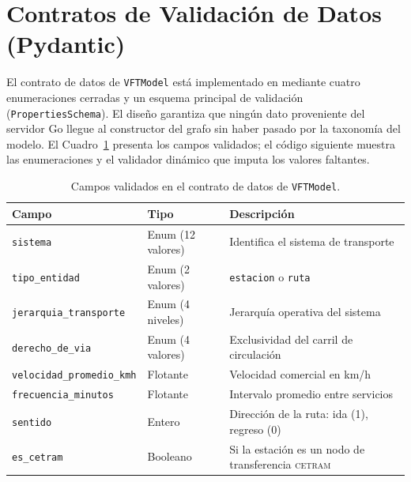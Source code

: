 
\section{Contratos de Validación de Datos (Pydantic)}
\label{anx:vft-validacion}

El contrato de datos de \texttt{VFTModel} está implementado en
 mediante cuatro enumeraciones cerradas y un
esquema principal de validación (\texttt{PropertiesSchema}). El diseño garantiza
que ningún dato proveniente del servidor Go llegue al constructor del grafo sin
haber pasado por la taxonomía del modelo. El
Cuadro~\ref{tab:vft-campos-validados} presenta los campos validados; el código
siguiente muestra las enumeraciones y el validador dinámico que imputa los
valores faltantes.

\begin{table}[H]
    \centering
    \caption[Campos validados en el contrato de datos de \texttt{VFTModel}]{Campos
    validados en el contrato de datos de \texttt{VFTModel}.
    }
    \label{tab:vft-campos-validados}
    \begin{tabularx}{\textwidth}{|l|l|X|}
        \hline
        \textbf{Campo} & \textbf{Tipo} & \textbf{Descripción} \\
        \hline
        \texttt{sistema}                  & Enum (12 valores) &
            Identifica el sistema de transporte \\
        \texttt{tipo\_entidad}            & Enum (2 valores) &
            \texttt{estacion} o \texttt{ruta} \\
        \texttt{jerarquia\_transporte}    & Enum (4 niveles) &
            Jerarquía operativa del sistema \\
        \texttt{derecho\_de\_via}         & Enum (4 valores) &
            Exclusividad del carril de circulación \\
        \texttt{velocidad\_promedio\_kmh} & Flotante &
            Velocidad comercial en km/h \\
        \texttt{frecuencia\_minutos}      & Flotante &
            Intervalo promedio entre servicios \\
        \texttt{sentido}                  & Entero &
            Dirección de la ruta: ida (1), regreso (0) \\
        \texttt{es\_cetram}               & Booleano &
            Si la estación es un nodo de transferencia \textsc{cetram} \\
        \hline
    \end{tabularx}
\end{table}

